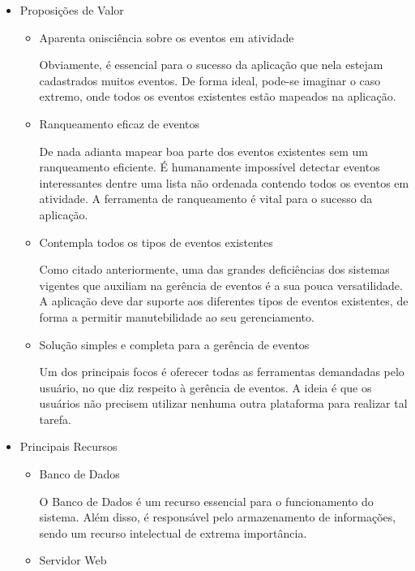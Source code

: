 \begin{itemize}

\item Proposições de Valor

\begin{itemize}

\item Aparenta onisciência sobre os eventos em atividade

Obviamente, é essencial para o sucesso da aplicação que nela estejam cadastrados muitos eventos. De forma ideal, pode-se imaginar o caso extremo, onde todos os eventos existentes estão mapeados na aplicação.

\item Ranqueamento eficaz de eventos

De nada adianta mapear boa parte dos eventos existentes sem um ranqueamento eficiente. É humanamente impossível detectar eventos interessantes dentre uma lista não ordenada contendo todos os eventos em atividade. A ferramenta de ranqueamento é vital para o sucesso da aplicação.

\item Contempla todos os tipos de eventos existentes

Como citado anteriormente, uma das grandes deficiências dos sistemas vigentes que auxiliam na gerência de eventos é a sua pouca versatilidade. A aplicação deve dar suporte aos diferentes tipos de eventos existentes, de forma a permitir manutebilidade ao seu gerenciamento.

\item Solução simples e completa para a gerência de eventos

Um dos principais focos é oferecer todas as ferramentas demandadas pelo usuário, no que diz respeito à gerência de eventos. A ideia é que os usuários não precisem utilizar nenhuma outra plataforma para realizar tal tarefa.

\end{itemize}

\item Principais Recursos

\begin{itemize}

\item Banco de Dados

O Banco de Dados é um recurso essencial para o funcionamento do sistema. Além disso, é responsável pelo armazenamento de informações, sendo um recurso intelectual de extrema importância.
\item Servidor Web


\end{itemize}
\end{itemize}
